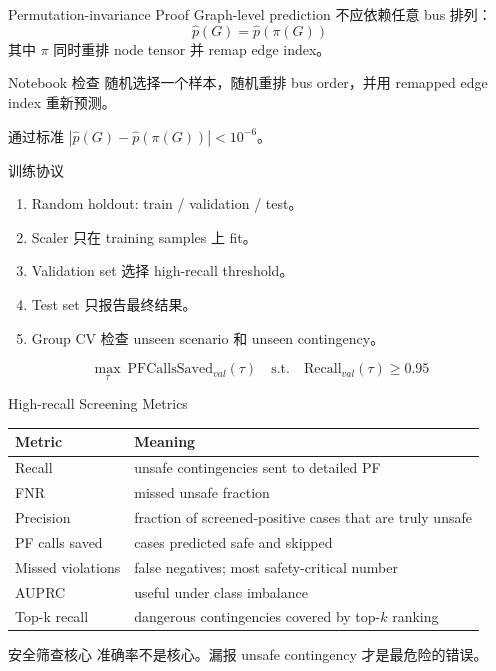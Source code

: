 \documentclass[aspectratio=169,11pt]{beamer}
\begin{document}
\begin{frame}{Permutation-invariance Proof}
Graph-level prediction 不应依赖任意 bus 排列：
\[
\hat p(G)=\hat p(\pi(G))
\]
其中 $\pi$ 同时重排 node tensor 并 remap edge index。
\begin{block}{Notebook 检查}
随机选择一个样本，随机重排 bus order，并用 remapped edge index 重新预测。
\end{block}
\begin{exampleblock}{通过标准}
$|\hat p(G)-\hat p(\pi(G))| < 10^{-6}$。
\end{exampleblock}
\end{frame}

\begin{frame}{训练协议}
\begin{enumerate}
  \item Random holdout: train / validation / test。
  \item Scaler 只在 training samples 上 fit。
  \item Validation set 选择 high-recall threshold。
  \item Test set 只报告最终结果。
  \item Group CV 检查 unseen scenario 和 unseen contingency。
\end{enumerate}
\[
\max_\tau\ \mathrm{PFCallsSaved}_{val}(\tau)
\quad \mathrm{s.t.}\quad
\mathrm{Recall}_{val}(\tau)\ge 0.95
\]
\end{frame}

\begin{frame}{High-recall Screening Metrics}
\small
\begin{tabular}{ll}
\toprule
Metric & Meaning \\
\midrule
Recall & unsafe contingencies sent to detailed PF \\
FNR & missed unsafe fraction \\
Precision & fraction of screened-positive cases that are truly unsafe \\
PF calls saved & cases predicted safe and skipped \\
Missed violations & false negatives; most safety-critical number \\
AUPRC & useful under class imbalance \\
Top-k recall & dangerous contingencies covered by top-$k$ ranking \\
\bottomrule
\end{tabular}
\vspace{0.25cm}
\begin{alertblock}{安全筛查核心}
准确率不是核心。漏报 unsafe contingency 才是最危险的错误。
\end{alertblock}
\end{frame}
\end{document}
